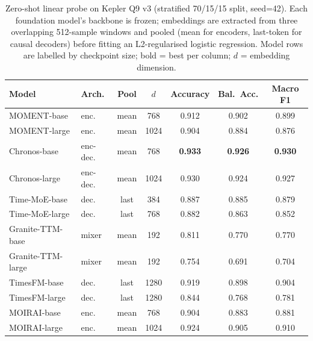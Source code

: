 \begin{table}[h]
\centering
\caption{Zero-shot linear probe on Kepler Q9 v3 (stratified 70/15/15 split, seed=42). Each foundation model's backbone is frozen; embeddings are extracted from three overlapping 512-sample windows and pooled (mean for encoders, last-token for causal decoders) before fitting an L2-regularised logistic regression. Model rows are labelled by checkpoint size; bold = best per column; $d$ = embedding dimension.}
\label{tab:kepler_q9v3_linear_probe}
\begin{tabular}{llccccc}
\toprule
Model & Arch. & Pool & $d$ & Accuracy & Bal.\ Acc. & Macro F1 \\
\midrule
MOMENT-base & enc. & mean & 768 & 0.912 & 0.902 & 0.899 \\
MOMENT-large & enc. & mean & 1024 & 0.904 & 0.884 & 0.876 \\
\midrule
Chronos-base & enc-dec. & mean & 768 & \textbf{0.933} & \textbf{0.926} & \textbf{0.930} \\
Chronos-large & enc-dec. & mean & 1024 & 0.930 & 0.924 & 0.927 \\
\midrule
Time-MoE-base & dec. & last & 384 & 0.887 & 0.885 & 0.879 \\
Time-MoE-large & dec. & last & 768 & 0.882 & 0.863 & 0.852 \\
\midrule
Granite-TTM-base & mixer & mean & 192 & 0.811 & 0.770 & 0.770 \\
Granite-TTM-large & mixer & mean & 192 & 0.754 & 0.691 & 0.704 \\
\midrule
TimesFM-base & dec. & last & 1280 & 0.919 & 0.898 & 0.904 \\
TimesFM-large & dec. & last & 1280 & 0.844 & 0.768 & 0.781 \\
\midrule
MOIRAI-base & enc. & mean & 768 & 0.904 & 0.883 & 0.881 \\
MOIRAI-large & enc. & mean & 1024 & 0.924 & 0.905 & 0.910 \\
\bottomrule
\end{tabular}
\end{table}

